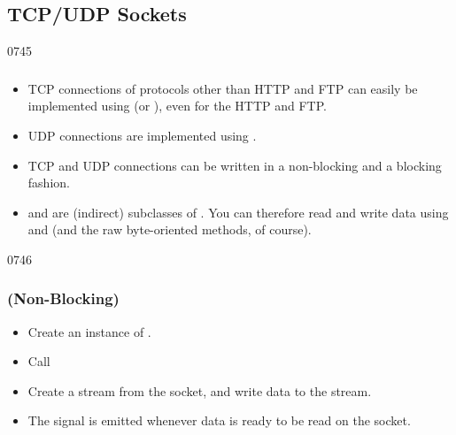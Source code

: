 


\subsection{TCP/UDP Sockets}
\begin{slide}[fragile]{0745}
\frametitle{}\label{tcp-sockets}
  \begin{itemize}
  \item TCP connections of protocols other than HTTP and FTP can
        easily be implemented using  (or
        ), even for the HTTP and FTP.
  \item UDP connections are implemented using .
  \item TCP and UDP connections can be written in a non-blocking and a
        blocking fashion.
  \item {} and  are (indirect)
        subclasses of . You can therefore read and
        write data using  and 
        (and the raw byte-oriented methods, of course).
  \end{itemize}
\end{slide}
\begin{slide}{0746}
\frametitle{ (Non-Blocking)}
  \begin{itemize}
  \item Create an instance of .
  \item Call 
  \item Create a stream from the socket, and write data to the stream.
  \item The signal  is emitted whenever data is
    ready to be read on the socket.
  \end{itemize}
\end{slide}

